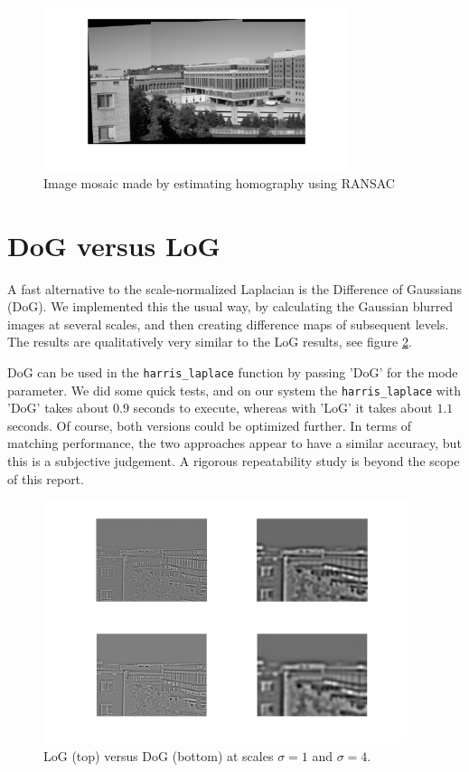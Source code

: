 \documentclass[a4paper,10pt]{article}
\begin{document}
\begin{figure}[h!t]
\centering
\includegraphics[width=0.8\textwidth]{img/mosaic}
\caption{Image mosaic made by estimating homography using RANSAC}
\label{fig:mosaic}
\end{figure}

\section{DoG versus LoG}
A fast alternative to the scale-normalized Laplacian is the Difference of Gaussians (DoG).
We implemented this the usual way, by calculating the Gaussian blurred images at several scales, and then creating difference maps of subsequent levels.
The results are qualitatively very similar to the LoG results, see figure \ref{fig:logdog}.

DoG can be used in the \verb+harris_laplace+ function by passing 'DoG' for the mode parameter.
We did some quick tests, and on our system the \verb+harris_laplace+ with 'DoG' takes about $0.9$ seconds to execute, whereas with 'LoG' it takes about $1.1$ seconds.
Of course, both versions could be optimized further.
In terms of matching performance, the two approaches appear to have a similar accuracy, but this is a subjective judgement.
A rigorous repeatability study is beyond the scope of this report.

\begin{figure}[h!t]
\centering
\includegraphics[width=0.95\textwidth]{img/LOG_DOG}
\caption{LoG (top) versus DoG (bottom) at scales $\sigma = 1$ and $\sigma = 4$.}
\label{fig:logdog}
\end{figure}
\end{document}

